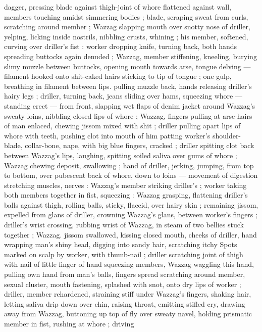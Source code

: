 {dagger, pressing blade against thigh-joint of whore flattened against 
wall, members touching amidst simmering bodies ; blade, scraping 
sweat from curls, scratching around member ; Wazzag slapping 
mouth over snotty nose of driller, yelping, licking inside nostrils, 
nibbling crusts, whining ; his member, softened, curving over driller's 
fist : worker dropping knife, turning back, both hands spreading 
buttocks again denuded ; Wazzag, member stiffening, kneeling, 
burying slimy muzzle between buttocks, opening mouth towards 
arse, tongue delving --- filament hooked onto shit-caked hairs 
sticking to tip of tongue ; one gulp, breathing in filament between 
lips. pulling muzzle back, hands releasing driller's hairy legs ; driller, 
turning back, jeans sliding over hams, squeezing whore --- standing 
erect --- from front, slapping wet flaps of denim jacket around 
Wazzag's sweaty loins, nibbling closed lips of whore ; Wazzag, 
fingers pulling at arse-hairs of man enlaced, chewing jissom mixed 
with shit ; driller pulling apart lips of whore with teeth, pushing clot 
into mouth of him patting worker's shoulder-blade, collar-bone, 
nape, with big blue fingers, cracked ; driller spitting clot back 
between Wazzag's lips, laughing, spitting soiled saliva over gums of 
whore ; Wazzag chewing deposit, swallowing ; hand of driller, jerking, 
jumping, from top to bottom, over pubescent back of whore, down to 
loins --- movement of digestion stretching muscles, nerves : 
Wazzag's member striking driller's ; worker taking both members 
together in fist, squeezing : Wazzag grasping, flattening driller's 
balls against thigh, rolling balls, sticky, flaccid, over hairy skin ; 
remaining jissom, expelled from glans of driller, crowning Wazzag's 
glans, between worker's fingers ; driller's wrist crossing, rubbing 
wrist of Wazzag, in steam of two bellies stuck together ; Wazzag. 
jissom swallowed, kissing closed mouth, cheeks of driller, hand 
wrapping man's shiny head, digging into sandy hair, scratching itchy 
Spots marked on scalp by worker, with thumb-nail ; driller scratching 
joint of thigh with nail of little finger of hand squeezing members, 
Wazzag waggling this hand, pulling own hand from man's balls, 
fingers spread scratching around member, sexual cluster, mouth 
fastening, splashed with snot, onto dry lips of worker ; driller, 
member rehardened, straining stiff under Wazzag's fingers, shaking 
hair, letting saliva drip down over chin, raising throat, emitting stifled 
cry, drawing away from Wazzag, buttoning up top of fly over sweaty 
navel, holding prismatic member in fist, rushing at whore ; driving 
}
